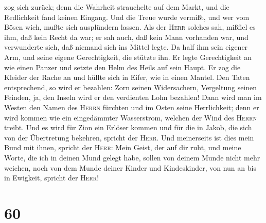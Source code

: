zog sich zurück; denn die Wahrheit strauchelte auf dem Markt, und die
Redlichkeit fand keinen Eingang.  Und die Treue wurde
vermißt, und wer vom Bösen wich, mußte sich ausplündern lassen. Als der
\textsc{Herr} solches sah, mißfiel es ihm, daß kein Recht da war;
 er sah auch, daß kein Mann vorhanden war, und
verwunderte sich, daß niemand sich ins Mittel legte. Da half ihm sein
eigener Arm, und seine eigene Gerechtigkeit, die stützte ihn.
 Er legte Gerechtigkeit an wie einen Panzer und setzte
den Helm des Heils auf sein Haupt. Er zog die Kleider der Rache an und
hüllte sich in Eifer, wie in einen Mantel.  Den Taten
entsprechend, so wird er bezahlen: Zorn seinen Widersachern, Vergeltung
seinen Feinden, ja, den Inseln wird er den verdienten Lohn bezahlen!
 Dann wird man im Westen den Namen des \textsc{Herrn}
fürchten und im Osten seine Herrlichkeit; denn er wird kommen wie ein
eingedämmter Wasserstrom, welchen der Wind des \textsc{Herrn} treibt.
 Und es wird für Zion ein Erlöser kommen und für die in
Jakob, die sich von der Übertretung bekehren, spricht der \textsc{Herr}.
 Und meinerseits ist dies mein Bund mit ihnen, spricht
der \textsc{Herr}: Mein Geist, der auf dir ruht, und meine Worte, die
ich in deinen Mund gelegt habe, sollen von deinem Munde nicht mehr
weichen, noch von dem Munde deiner Kinder und Kindeskinder, von nun an
bis in Ewigkeit, spricht der \textsc{Herr}!

\hypertarget{section-59}{%
\section{60}\label{section-59}}

